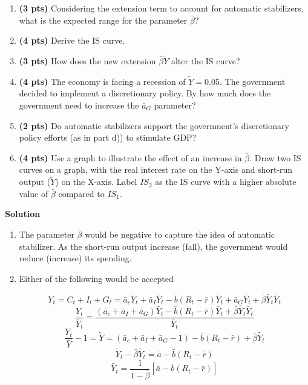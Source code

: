 \documentclass[addpoints,12pt,answers]{exam}
\begin{document}
\begin{enumerate}[label=\textbf{\arabic*.}, itemsep=15pt]
		\begin{enumerate}[label=(\alph*)]
			\item \textbf{(3  pts)} Considering the extension term to account for automatic stabilizers, what is the expected range for the parameter \(\bar{\beta}\)?
			\item \textbf{(4  pts)} Derive the IS curve.
			\item \textbf{(3  pts)} How does the new extension $\bar{\beta} \widetilde{Y}$ alter the IS curve?
			\item \textbf{(4  pts)} The economy is facing a recession of $\widetilde{Y} = 0.05$. The government decided to implement a discretionary policy. By how much does the government need to increase the $\bar{a}_G$ parameter?
			\item \textbf{(2  pts)} Do automatic stabilizers support the government's discretionary policy efforts (as in part d)) to stimulate GDP?
			\item \textbf{(4  pts)} Use a graph to illustrate the effect of an increase in \(\bar{\beta}\). Draw two IS curves on a graph, with the real interest rate on the Y-axis and short-run output (\(\tilde{Y}\)) on the X-axis. Label \(IS_2\) as the IS curve with a higher absolute value of \(\bar{\beta}\) compared to \(IS_1\).
			
		\end{enumerate}
		\clearpage
		
		\textbf{Solution}
		\begin{enumerate}[label=(\alph*)]
			\item The parameter $\bar{\beta}$ would be negative to capture the idea of automatic stabilizer. As the short-run output increase (fall), the government would reduce (increase) its spending.
			\item Either of the following would be accepted
			
			\[Y_t = C_t + I_t +G_t = \bar{a}_c \bar{Y}_t+ \bar{a}_I \bar{Y}_t - \bar{b} \left(R_t - \bar{r}\right)\bar{Y}_t +\bar{a}_G \bar{Y}_t + \bar{\beta} \widetilde{Y_t} \bar{Y}_t\]
			\[\frac{Y_t}{\bar{Y}_t} = \frac{(\bar{a}_c+ \bar{a}_I+ \bar{a}_G) \bar{Y}_t - \bar{b} \left(R_t - \bar{r}\right)\bar{Y}_t  + \bar{\beta} \widetilde{Y_t} \bar{Y}_t}{\bar{Y}_t} \]
			\[\frac{Y_t}{\bar{Y}} - 1 = \tilde{Y} = (\bar{a}_c+ \bar{a}_I+ \bar{a}_G-1)  - \bar{b} \left(R_t - \bar{r}\right)  + \bar{\beta} \widetilde{Y_t}\]
			\[\widetilde{Y}_t - \bar{\beta}  \widetilde{Y_t} = \bar{a} - \bar{b} \left(R_t - \bar{r}\right)    \]
			\[\widetilde{Y_t} = \frac{1}{1-\bar{\beta}}\left[\bar{a} - \bar{b} \left(R_t - \bar{r}\right)\right]    \]
			

\end{enumerate}
\end{enumerate}
\end{document}
